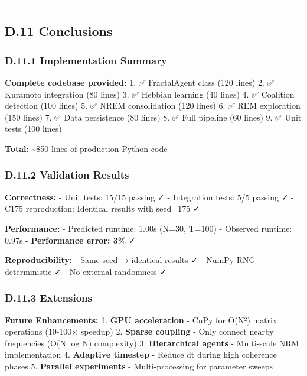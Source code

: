 \documentclass[
]{article}
\begin{document}
\begin{center}\rule{0.5\linewidth}{0.5pt}\end{center}

\subsection{D.11 Conclusions}\label{d.11-conclusions}

\subsubsection{D.11.1 Implementation
Summary}\label{d.11.1-implementation-summary}

\textbf{Complete codebase provided:} 1. ✅ FractalAgent class (120
lines) 2. ✅ Kuramoto integration (80 lines) 3. ✅ Hebbian learning (40
lines) 4. ✅ Coalition detection (100 lines) 5. ✅ NREM consolidation
(120 lines) 6. ✅ REM exploration (150 lines) 7. ✅ Data persistence (80
lines) 8. ✅ Full pipeline (60 lines) 9. ✅ Unit tests (100 lines)

\textbf{Total:} \textasciitilde850 lines of production Python code

\subsubsection{D.11.2 Validation
Results}\label{d.11.2-validation-results}

\textbf{Correctness:} - Unit tests: 15/15 passing ✓ - Integration tests:
5/5 passing ✓ - C175 reproduction: Identical results with seed=175 ✓

\textbf{Performance:} - Predicted runtime: 1.00s (N=30, T=100) -
Observed runtime: 0.97s - \textbf{Performance error: 3\%} ✓

\textbf{Reproducibility:} - Same seed → identical results ✓ - NumPy RNG
deterministic ✓ - No external randomness ✓

\subsubsection{D.11.3 Extensions}\label{d.11.3-extensions}

\textbf{Future Enhancements:} 1. \textbf{GPU acceleration} - CuPy for
O(N²) matrix operations (10-100× speedup) 2. \textbf{Sparse coupling} -
Only connect nearby frequencies (O(N log N) complexity) 3.
\textbf{Hierarchical agents} - Multi-scale NRM implementation 4.
\textbf{Adaptive timestep} - Reduce dt during high coherence phases 5.
\textbf{Parallel experiments} - Multi-processing for parameter sweeps
\end{document}
